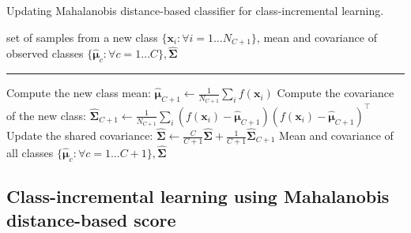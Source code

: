 \documentclass{article}
\begin{document}
\begin{algorithm}[t]
\caption{Updating Mahalanobis distance-based classifier for class-incremental learning.} \label{alg:update_mahalanobis}
\begin{algorithmic}
 set of samples from a new class $\{ \mathbf{x}_i : \forall i = 1 \dots N_{C+1} \}$, mean and covariance of observed classes $\{  \widehat{\mathbf{\mu}}_c: \forall c = 1 \dots C \},  \widehat{\mathbf{\Sigma}}$
\vspace{0.05in}
\hrule
\vspace{0.05in}
\State Compute the new class mean: $ \widehat{\mathbf{\mu}}_{C+1} \leftarrow \frac{1}{N_{C+1}} \sum_i f(\mathbf{x}_i)$
\State Compute the covariance of the new class: $ \widehat{\mathbf{\Sigma}}_{C+1} \leftarrow \frac{1}{N_{C+1}} \sum_i (f(\mathbf{x}_i) -  \widehat{\mathbf{\mu}}_{C+1}) (f(\mathbf{x}_i) -  \widehat{\mathbf{\mu}}_{C+1})^\top$
\State Update the shared covariance: $ \widehat{\mathbf{\Sigma}} \leftarrow \frac{C}{C+1} \widehat{\mathbf{\Sigma}} + \frac{1}{C+1} \widehat{\mathbf{\Sigma}}_{C+1}$
\State \Return Mean and covariance of all classes $\{  \widehat{\mathbf{\mu}}_c: \forall c = 1 \dots C+1 \},  \widehat{\mathbf{\Sigma}}$
\end{algorithmic}
\end{algorithm}


\subsection{Class-incremental learning using Mahalanobis distance-based score}\label{sec:incrementalsetup}
\end{document}
